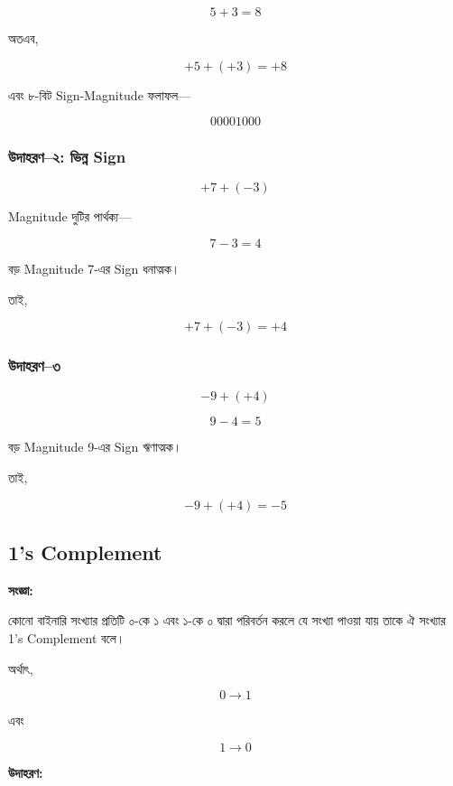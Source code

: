 \[
5+3=8
\]

অতএব,

\[
\boxed{+5+(+3)=+8}
\]

এবং ৮-বিট \textenglish{Sign-Magnitude} ফলাফল—

\[
\boxed{00001000}
\]

\subsubsection*{উদাহরণ--২: ভিন্ন \textenglish{Sign}}

\[
+7+(-3)
\]

\textenglish{Magnitude} দুটির পার্থক্য—

\[
7-3=4
\]

বড় \textenglish{Magnitude} 7-এর \textenglish{Sign} ধনাত্মক।

তাই,

\[
\boxed{+7+(-3)=+4}
\]

\subsubsection*{উদাহরণ--৩}

\[
-9+(+4)
\]

\[
9-4=5
\]

বড় \textenglish{Magnitude} 9-এর \textenglish{Sign} ঋণাত্মক।

তাই,

\[
\boxed{-9+(+4)=-5}
\]


\subsection{\textenglish{1's Complement}}

\par\begingroup

\textbf{সংজ্ঞা:}

কোনো বাইনারি সংখ্যার প্রতিটি ০-কে ১ এবং ১-কে ০ দ্বারা পরিবর্তন করলে
যে সংখ্যা পাওয়া যায় তাকে ঐ সংখ্যার
\textenglish{1's Complement} বলে।
\par\endgroup


অর্থাৎ,

\[
0\rightarrow1
\]

এবং

\[
1\rightarrow0
\]

\textbf{\textcolor{ICTOrange}{উদাহরণ:}}

